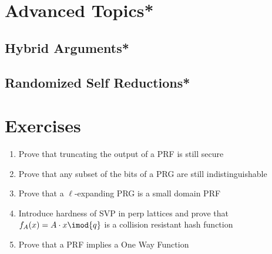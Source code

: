 \documentclass[A4, 11pt]{article}
\begin{document}
\section{Advanced Topics*}

\subsection{Hybrid Arguments*}

\subsection{Randomized Self Reductions*}

\section{Exercises}

\begin{enumerate}
\item Prove that truncating the output of a PRF is still secure
\item Prove that any subset of the bits of a PRG are still indistinguishable
\item Prove that a $\ell$-expanding PRG is a small domain PRF
\item Introduce hardness of SVP in perp lattices and prove that
$f_A(x)=A\cdot x \imod{q}$ is a collision resistant hash function
\item Prove that a PRF implies a One Way Function
\end{enumerate}
\end{document}
